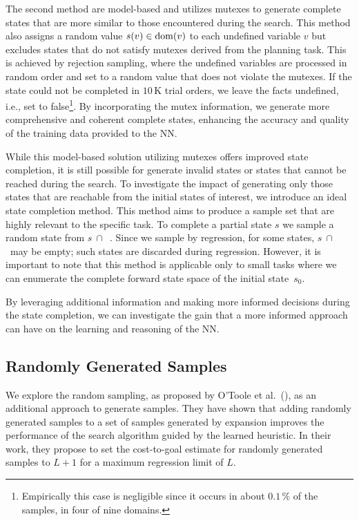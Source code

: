 The second method are model-based and utilizes mutexes to generate complete states that are more similar to those encountered during the search. This method also assigns a random value $s(v)\in\operatorname{dom}(v)$ to each undefined variable $v$ but excludes states that do not satisfy mutexes derived from the planning task. This is achieved by rejection sampling, where the undefined variables are processed in random order and set to a random value that does not violate the mutexes. If the state could not be completed in $10$\,K trial orders, we leave the facts undefined, i.e., set to false\footnote{Empirically this case is negligible since it occurs in about $0.1\,\%$ of the samples, in four of nine domains.}. By incorporating the mutex information, we generate more comprehensive and coherent complete states, enhancing the accuracy and quality of the training data provided to the NN.

While this model-based solution utilizing mutexes offers improved state completion, it is still possible for generate invalid states or states that cannot be reached during the search. To investigate the impact of generating only those states that are reachable from the initial states of interest, we introduce an ideal state completion method. This method aims to produce a sample set that are highly relevant to the specific task. To complete a partial state $s$ we sample a random state from $s~\cap$~\fssp. Since we sample by regression, for some states, $s~\cap$~\fssp may be empty; such states are discarded during regression. However, it is important to note that this method is applicable only to small tasks where we can enumerate the complete forward state space \fssp of the initial state~$s_0$.

By leveraging additional information and making more informed decisions during the state completion, we can investigate the gain that a more informed approach can have on the learning and reasoning of the NN.

\subsection{Randomly Generated Samples}
\label{sec:random-samples-theory}

We explore the random sampling, as proposed by O'Toole et al.~(\citeyear{OToole/2022}), as an additional approach to generate samples. They have shown that adding randomly generated samples to a set of samples generated by expansion improves the performance of the search algorithm guided by the learned heuristic. In their work, they propose to set the cost-to-goal estimate for randomly generated samples to $L+1$ for a maximum regression limit of $L$.


